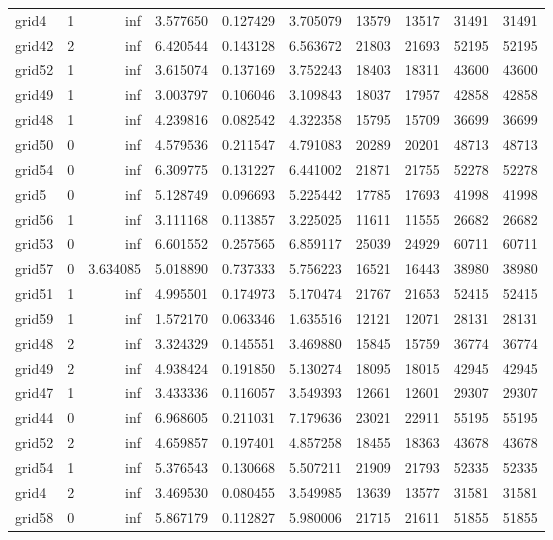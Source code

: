 \begin{longtable}{|l|r|r|r|r|r|r|r|r|r|}
grid4 & 1 & inf & 3.577650 & 0.127429 & 3.705079 & 13579 & 13517 & 31491 & 31491 \\
grid42 & 2 & inf & 6.420544 & 0.143128 & 6.563672 & 21803 & 21693 & 52195 & 52195 \\
grid52 & 1 & inf & 3.615074 & 0.137169 & 3.752243 & 18403 & 18311 & 43600 & 43600 \\
grid49 & 1 & inf & 3.003797 & 0.106046 & 3.109843 & 18037 & 17957 & 42858 & 42858 \\
grid48 & 1 & inf & 4.239816 & 0.082542 & 4.322358 & 15795 & 15709 & 36699 & 36699 \\
grid50 & 0 & inf & 4.579536 & 0.211547 & 4.791083 & 20289 & 20201 & 48713 & 48713 \\
grid54 & 0 & inf & 6.309775 & 0.131227 & 6.441002 & 21871 & 21755 & 52278 & 52278 \\
grid5 & 0 & inf & 5.128749 & 0.096693 & 5.225442 & 17785 & 17693 & 41998 & 41998 \\
grid56 & 1 & inf & 3.111168 & 0.113857 & 3.225025 & 11611 & 11555 & 26682 & 26682 \\
grid53 & 0 & inf & 6.601552 & 0.257565 & 6.859117 & 25039 & 24929 & 60711 & 60711 \\
grid57 & 0 & 3.634085 & 5.018890 & 0.737333 & 5.756223 & 16521 & 16443 & 38980 & 38980 \\
grid51 & 1 & inf & 4.995501 & 0.174973 & 5.170474 & 21767 & 21653 & 52415 & 52415 \\
grid59 & 1 & inf & 1.572170 & 0.063346 & 1.635516 & 12121 & 12071 & 28131 & 28131 \\
grid48 & 2 & inf & 3.324329 & 0.145551 & 3.469880 & 15845 & 15759 & 36774 & 36774 \\
grid49 & 2 & inf & 4.938424 & 0.191850 & 5.130274 & 18095 & 18015 & 42945 & 42945 \\
grid47 & 1 & inf & 3.433336 & 0.116057 & 3.549393 & 12661 & 12601 & 29307 & 29307 \\
grid44 & 0 & inf & 6.968605 & 0.211031 & 7.179636 & 23021 & 22911 & 55195 & 55195 \\
grid52 & 2 & inf & 4.659857 & 0.197401 & 4.857258 & 18455 & 18363 & 43678 & 43678 \\
grid54 & 1 & inf & 5.376543 & 0.130668 & 5.507211 & 21909 & 21793 & 52335 & 52335 \\
grid4 & 2 & inf & 3.469530 & 0.080455 & 3.549985 & 13639 & 13577 & 31581 & 31581 \\
grid58 & 0 & inf & 5.867179 & 0.112827 & 5.980006 & 21715 & 21611 & 51855 & 51855 \\

\end{longtable}
